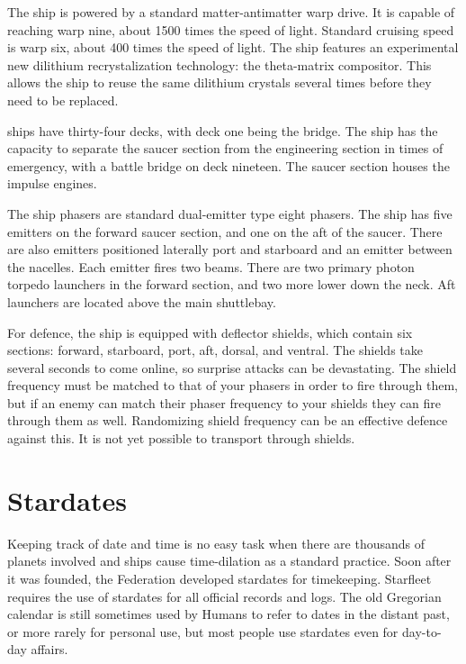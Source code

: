 \documentclass[12pt]{article}
\begin{document}
The ship is powered by a standard matter-antimatter warp drive. It is capable
of reaching warp nine, about 1500 times the speed of light. Standard cruising
speed is warp six, about 400 times the speed of light. The ship features an
experimental new dilithium recrystalization technology: the theta-matrix
compositor. This allows the ship to reuse the same dilithium crystals several
times before they need to be replaced.

 ships have thirty-four decks, with deck one being the bridge.
The ship has the capacity to separate the saucer section from the engineering
section in times of emergency, with a battle bridge on deck nineteen. The
saucer section houses the impulse engines.

The ship phasers are standard dual-emitter type eight phasers. The ship has
five emitters on the forward saucer section, and one on the aft of the saucer.
There are also emitters positioned laterally port and starboard and an emitter
between the nacelles. Each emitter fires two beams. There are two primary
photon torpedo launchers in the forward section, and two more lower down the
neck. Aft launchers are located above the main shuttlebay.

For defence, the ship is equipped with deflector shields, which contain six
sections: forward, starboard, port, aft, dorsal, and ventral. The shields take
several seconds to come online, so surprise attacks can be devastating. The
shield frequency must be matched to that of your phasers in order to fire
through them, but if an enemy can match their phaser frequency to your shields
they can fire through them as well. Randomizing shield frequency can be an
effective defence against this. It is not yet possible to transport through
shields.

\section{Stardates}

Keeping track of date and time is no easy task when there are thousands of
planets involved and ships cause time-dilation as a standard practice. Soon
after it was founded, the Federation developed stardates for timekeeping.
Starfleet requires the use of stardates for all official records and logs. The
old Gregorian calendar is still sometimes used by Humans to refer to dates in
the distant past, or more rarely for personal use, but most people use
stardates even for day-to-day affairs.
\end{document}
